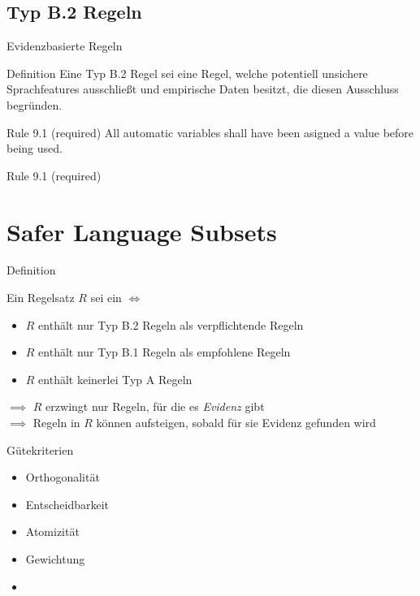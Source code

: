 \documentclass{beamer}
\begin{document}
    \subsection{Typ B.2 Regeln}
    \label{subsec:typ-b-2-regeln}
    \begin{frame}{Evidenzbasierte Regeln}
         {
            \begin{block}{Definition}
                Eine Typ B.2 Regel sei eine Regel, welche potentiell unsichere Sprachfeatures ausschließt und empirische
                Daten besitzt, die diesen Ausschluss begründen.
            \end{block}
            \pause
            \begin{exampleblock}{Rule 9.1 (required)}
                All automatic variables shall have been asigned a value before being used.
            \end{exampleblock}
        }
         {
            \begin{exampleblock}{Rule 9.1 (required)}
                
            \end{exampleblock}
        }
    \end{frame}

    \section{Safer Language Subsets}
    \label{sec:safer-language-subsets}
    \begin{frame}{Definition}
        \begin{block}{Ein Regelsatz $R$ sei ein \sls $\iff$}
            \begin{itemize}
                \item $R$ enthält nur Typ B.2 Regeln als verpflichtende Regeln
                \item $R$ enthält nur Typ B.1 Regeln als empfohlene Regeln
                \item $R$ enthält keinerlei Typ A Regeln
            \end{itemize}
        \end{block}
        \pause
        $\implies$ $R$ erzwingt nur Regeln, für die es \textit{Evidenz} gibt\\
        \pause
        $\implies$ Regeln in $R$ können aufsteigen, sobald für sie Evidenz gefunden wird
    \end{frame}

    \begin{frame}{Gütekriterien}
        \begin{itemize}
            \item Orthogonalität
            \item Entscheidbarkeit
            \item Atomizität
            \item Gewichtung
            \item {}
        \end{itemize}
    \end{frame}
\end{document}
